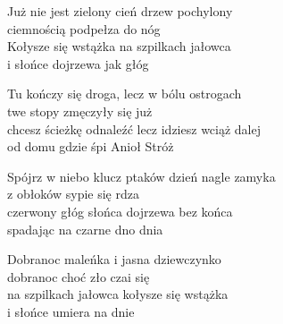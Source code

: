 \begin{text}
    Już nie jest zielony cień drzew pochylony\\
    ciemnością podpełza do nóg\\
    Kołysze się wstążka na szpilkach jałowca\\
    i słońce dojrzewa jak głóg

    Tu kończy się droga, lecz w bólu ostrogach\\
    twe stopy zmęczyły się już\\
    chcesz ścieżkę odnaleźć lecz idziesz wciąż dalej\\
    od domu gdzie śpi Anioł Stróż

    Spójrz w niebo klucz ptaków dzień nagle zamyka\\
    z obłoków sypie się rdza\\
    czerwony głóg słońca dojrzewa bez końca\\
    spadając na czarne dno dnia

    Dobranoc maleńka i jasna dziewczynko\\
    dobranoc choć zło czai się\\
    na szpilkach jałowca kołysze się wstążka\\
    i słońce umiera na dnie
\end{text}
\begin{chord}

\end{chord}